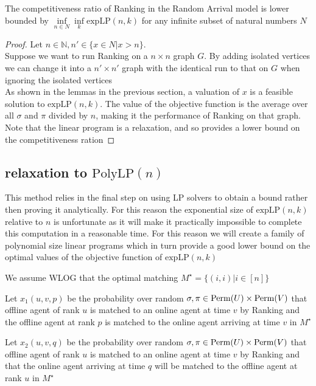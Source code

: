 \begin{lemma}
	The competitiveness ratio of Ranking in the Random Arrival model is lower bounded by $\inf\limits_{n\in N}\inf\limits_{k}\mathrm{expLP}(n,k)$ for any infinite subset of natural numbers $N$
\end{lemma}
\begin{proof}
	Let $n\in\mathbb{N},n'\in\{x\in N|x>n\}$.\\
	Suppose we want to run Ranking on a $n\times n$ graph $G$. By adding isolated vertices we can change it into a $n'\times n'$ graph with the identical run to that on $G$ when ignoring the isolated vertices\\
	As shown in the lemmas in the previous section, a valuation of $x$ is a feasible solution to $\mathrm{expLP}(n,k)$. The value of the objective function is the average over all $\sigma$ and $\pi$ divided by $n$, making it the performance of Ranking on that graph.  Note that the linear program is a relaxation, and so provides a lower bound on the competitiveness ration
\end{proof}

\subsection[relaxation to PolyLP(n)]{relaxation to $\mathrm{PolyLP}(n)$}

This method relies in the final step on using LP solvers to obtain a bound rather then proving it analytically. For this reason the exponential size of $\mathrm{expLP}(n,k)$ relative to $n$ is unfortunate as it will make it practically impossible to complete this computation in a reasonable time. For this reason we will create a family of polynomial size linear programs which in turn provide a good lower bound on the optimal values of the objective function of $\mathrm{expLP}(n,k)$

We assume WLOG that the optimal matching $M^\star=\{(i,i)|i\in[n]\}$

Let $x_1(u,v,p)$ be the probability over random $\sigma,\pi\in\mathrm{Perm}(U)\times\mathrm{Perm}(V)$ that offline agent of rank $u$ is matched to an online agent at time $v$ by Ranking and the offline agent at rank $p$ is matched to the online agent arriving at time $v$ in $M^\star$

Let $x_2(u,v,q)$ be the probability over random $\sigma,\pi\in\mathrm{Perm}(U)\times\mathrm{Perm}(V)$ that offline agent of rank $u$ is matched to an online agent at time $v$ by Ranking and that the online agent arriving at time $q$ will be matched to the offline agent at rank $u$ in $M^\star$

